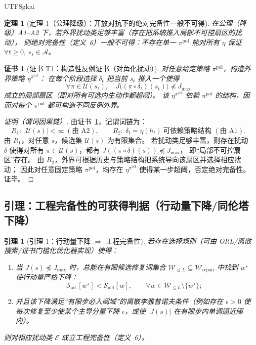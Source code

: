 \documentclass[12pt]{article}
\newtheorem{theorem}{定理}[section]
\newtheorem{lemma}{引理}[section]
\newtheorem{Certificate}{证书}[section]
\begin{document}
\begin{CJK*}{UTF8}{gkai}
\begin{theorem}[定理 1（公理降级）：开放对抗下的绝对完备性一般不可得]
\label{thm:tex25-thm1-absolute-impossible}
在公理（降级）A1--A2 下，若外界扰动类足够丰富（存在把系统推入局部不可控扇区的扰动），
则绝对完备性（定义~6）一般不可得：不存在单一 $\pi^{\mathrm{pol}}$ 能对所有 $\eta$ 保证 $\forall t\ge 0,\ s_t\in\mathcal{A}$。
\end{theorem}

\begin{Certificate}[证书 T1：构造性反例证书（对角化扰动）]
\label{cert:tex25-thm1-diagonal}
对任意给定策略 $\pi^{\mathrm{pol}}$，构造外界策略 $\eta^{\pi^{\mathrm{pol}}}$：
在每个阶段选择 $\delta_t$ 把当前 $s_t$ 推入一个使得
\[
  \forall \pi\in\mathcal{U}(s_t),\quad
  J\bigl((\pi\circ\delta_t)(s_t)\bigr)\not\preceq J_{\max}
\]
成立的局部扇区（即对所有可选内生动作都超阈）。
该 $\eta^{\pi^{\mathrm{pol}}}$ 依赖 $\pi^{\mathrm{pol}}$ 的结构，因而对每个 $\pi^{\mathrm{pol}}$ 都可构造不同反例外界。
\end{Certificate}

\begin{proof}[证明（谓词因果链）]
由证书~\ref{cert:tex25-thm1-diagonal}，记谓词链为：
\[
  R_1:\ |\mathcal{U}(s)|<\infty\ (\text{由 A2}),
  \qquad
  R_2:\ \delta_t=\eta(h_t)\ \text{可依赖策略结构 }(\text{由 A1}).
\]
由 $R_1$，对任意 $s$，候选集 $\mathcal{U}(s)$ 为有限集合。
若扰动类足够丰富，则存在扰动 $\delta$ 使得对所有 $\pi\in\mathcal{U}(s)$，都有 $J((\pi\circ\delta)(s))\not\preceq J_{\max}$，
即“局部不可控扇区”存在。
由 $R_2$，外界可根据历史与策略结构把系统导向该扇区并选择相应扰动；
因此对任意固定策略 $\pi^{\mathrm{pol}}$，均存在 $\eta^{\pi^{\mathrm{pol}}}$ 使得某一步超阈，否定绝对完备性。证毕。
\end{proof}

\subsection{引理：工程完备性的可获得判据（行动量下降/同伦塔下降）}
\label{subsec:tex25-lemma-operational}

\begin{lemma}[引理 1：行动量下降 $\Rightarrow$ 工程完备性]
\label{lem:tex25-lem1-action-descent}
若存在选择规则（可由 ORL/离散搜索/证书门槛化优化器实现）使得：
\begin{enumerate}
  \item 当 $J(s)\not\preceq J_{\max}$ 时，总能在有限候选修复词集合 $\mathcal{W}_{\le L}\subseteq\mathcal{W}_{\mathrm{repair}}$ 中找到
    $w^{\star}$ 使行动量严格下降：
  \[
    \mathcal{S}_{\mathrm{act}}[w^{\star}]<\mathcal{S}_{\mathrm{act}}[w],\qquad \forall w\in\mathcal{W}_{\le L}
      \setminus\{w^{\star}\};
  \]
  \item 并且该下降满足“有限步必入阈域”的离散李雅普诺夫条件（例如存在 $\epsilon>0$ 使每次修复至少使某个主导分量下降 $\epsilon$，或使 $|J(s)|$ 在有限步内单调逼近阈内）。
\end{enumerate}
则对相应扰动类 $\mathcal{E}$ 成立工程完备性（定义~6）。
\end{lemma}


\end{CJK*}
\end{document}
